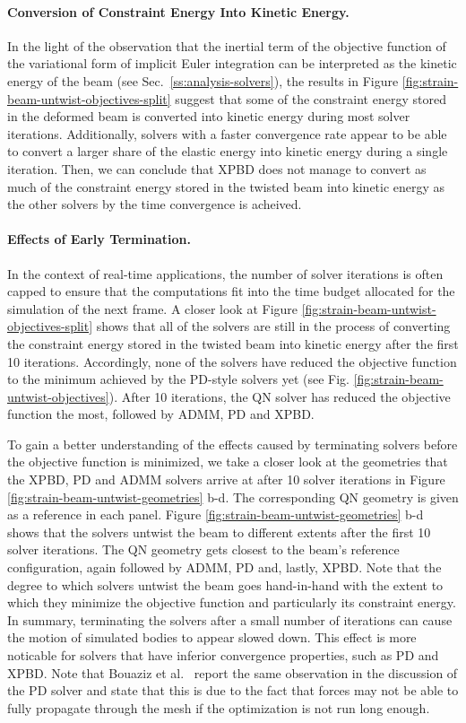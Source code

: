 \paragraph{Conversion of Constraint Energy Into Kinetic Energy.}
In the light of the observation that the inertial term of the objective function of the variational form of implicit Euler integration can be interpreted as the kinetic 
energy of the beam (see Sec.\ \ref{ss:analysis-solvers}), the results in Figure \ref{fig:strain-beam-untwist-objectives-split} suggest that some of the 
constraint energy stored in the deformed beam is converted into kinetic energy during most solver iterations. Additionally, solvers with a 
faster convergence rate appear to be able to convert a larger share of the elastic energy into kinetic energy during a single iteration. Then, we can conclude that XPBD 
does not manage to convert as much of the constraint energy stored in the twisted beam into kinetic energy as the other solvers by the time convergence is acheived.

\paragraph{Effects of Early Termination.}
In the context of real-time applications, the number of solver iterations is often capped to ensure that the computations fit into the time budget allocated 
for the simulation of the next frame. A closer look at Figure \ref{fig:strain-beam-untwist-objectives-split} shows that all of the solvers are still in the process of 
converting the constraint energy stored in the twisted beam into kinetic energy after the first 10 iterations. Accordingly, none of the solvers have reduced the 
objective function to the minimum achieved by the PD-style solvers yet (see Fig. \ref{fig:strain-beam-untwist-objectives}). After 10 iterations, the QN solver has reduced 
the objective function the most, followed by ADMM, PD and XPBD. 

To gain a better understanding of the effects caused by terminating solvers before the objective function is minimized, we take a 
closer look at the geometries that the XPBD, PD and ADMM solvers arrive at after 10 solver iterations in Figure \ref{fig:strain-beam-untwist-geometries} b-d. The 
corresponding QN geometry is given as a reference in each panel. Figure \ref{fig:strain-beam-untwist-geometries} b-d shows that the solvers untwist the beam to 
different extents after the first 10 solver iterations. The QN geometry gets closest to the beam's reference configuration, again followed by ADMM, PD and, lastly, 
XPBD. Note that the degree to which solvers untwist the beam goes hand-in-hand with the extent to which they minimize the objective function and particularly its 
constraint energy. In summary, terminating the solvers after a small number of iterations can cause the motion of simulated bodies to appear slowed down. 
This effect is more noticable for solvers that have inferior convergence properties, such as PD and XPBD. Note that Bouaziz et al.\ \cite{bouaziz2014} report 
the same observation in the discussion of the PD solver and state that this is due to the fact that forces may not be able to fully propagate through the mesh 
if the optimization is not run long enough. 

